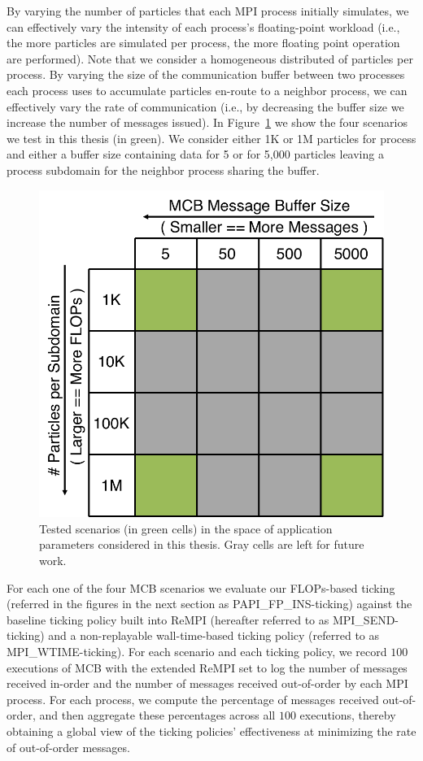 By varying the number of particles that each MPI process initially
simulates, we can effectively vary the intensity of each process's
floating-point workload (i.e., the more particles are simulated per
process, the more floating point operation are performed). Note that
we consider a homogeneous distributed of particles per process. By
varying the size of the communication buffer between two processes
each process uses to accumulate particles en-route to a neighbor
process, we can effectively vary the rate of communication (i.e., by
decreasing the buffer size we increase the number of messages
issued). In Figure~\ref{fig:parameter_matrix} we show the four
scenarios we test in this thesis (in green). We consider either 1K or
1M particles for process and either a buffer size containing data for
5 or for 5,000 particles leaving a process subdomain for the neighbor
process sharing the buffer.
\begin{figure}[!ht]
    \centering
    \includegraphics[width=0.5\linewidth]{chapter_3_figures/parameter_matrix.pdf}
    \caption{Tested scenarios (in green cells) in the space of
      application parameters considered in this thesis. Gray cells are
      left for future work.}
    \label{fig:parameter_matrix}
\end{figure}

For each one of the four MCB scenarios we evaluate our FLOPs-based
ticking (referred in the figures in the next section as
PAPI\_FP\_INS-ticking) against the baseline ticking policy built into
ReMPI (hereafter referred to as MPI\_SEND-ticking) and a
non-replayable wall-time-based ticking policy (referred to as
MPI\_WTIME-ticking). For each scenario and each ticking policy, we
record $100$ executions of MCB with the extended ReMPI set to log the
number of messages received in-order and the number of messages
received out-of-order by each MPI process. For each process, we
compute the percentage of messages received out-of-order, and then
aggregate these percentages across all $100$ executions, thereby
obtaining a global view of the ticking policies' effectiveness at
minimizing the rate of out-of-order messages.

